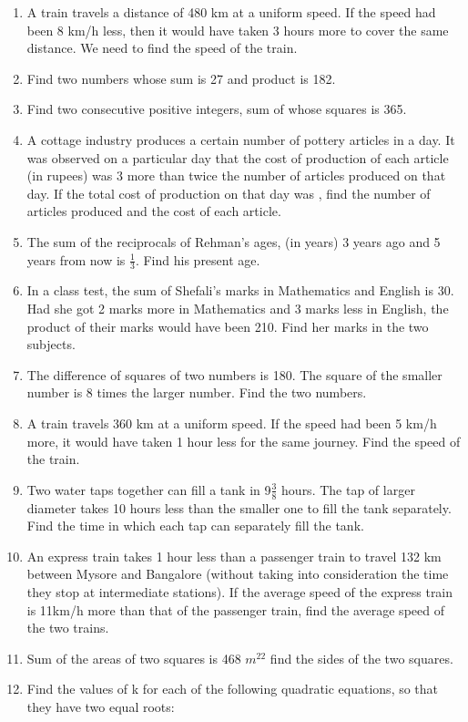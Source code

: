 \begin{enumerate}[label=\arabic*.,ref=\thesubsection.\theenumi]
\item A train travels a distance of 480 km at a uniform speed. If the speed had been 8 km/h less, then it would have taken 3 hours more to cover the same distance. We need to find the speed of the train.
\item Find two numbers whose sum is 27 and product is 182. 
\item  Find two consecutive positive integers, sum of whose squares is 365. 
\item  A cottage industry produces a certain number of pottery articles in a day. It was observed on a particular day that the cost of production of each article (in rupees) was 3 more than twice the number of articles produced on that day. If the total cost of production on that day was , find the number of articles produced and the cost of each article.\item The sum of the reciprocals of Rehman’s ages, (in years) 3 years ago and 5 years from now is $\frac{1}{3}$.  Find his present age.
\item In a class test, the sum of Shefali’s marks in Mathematics and English is 30. Had she got 2 marks more in Mathematics and 3 marks less in English, the product of their marks would have been 210. Find her marks in the two subjects.
\item The difference of squares of two numbers is 180. The square of the smaller number is 8 times the larger number. Find the two numbers.
\item A train travels 360 km at a uniform speed. If the speed had been 5 km/h more, it would have taken 1 hour less for the same journey. Find the speed of the train.
\item Two water taps together can fill a tank in 9$\frac{3}{ 8}$
hours. The tap of larger diameter takes 10
hours less than the smaller one to fill the tank separately. Find the time in which each tap can separately fill the tank.
\item An express train takes 1 hour less than a passenger train to travel 132 km between Mysore and Bangalore (without taking into consideration the time they stop at intermediate stations). If the average speed of the express train is 11km/h more than that of the passenger train, find the average speed of the two trains.
\item Sum of the areas of two squares is 468 $m^22$ find the sides of the two squares.
\item Find the values of k for each of the following quadratic equations, so that they have two equal roots:

\end{enumerate}
